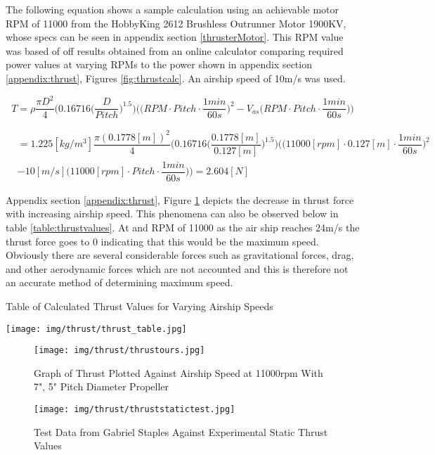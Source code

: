 \documentclass[../main.tex]{subfiles}
\begin{document}
The following equation shows a sample calculation using an achievable motor RPM of 11000 from the HobbyKing 2612 Brushless Outrunner Motor 1900KV, whose specs can be seen in appendix section \ref{thrusterMotor}. This RPM value was based of off results obtained from an online calculator comparing required power values at varying RPMs to the power shown in appendix section \ref{appendix:thrust}, Figures \ref{fig:thrustcalc}. An airship speed of 10m/s was used. 

\begin{equation}
\label{eqn:thrustfinal}
T = \rho \dfrac{\pi D^2}{4}\Bigg(0.16716\Big(\dfrac{D}{Pitch}\Big)^{1.5}\Bigg)\Bigg(\Big(RPM\cdot Pitch \cdot \dfrac{1min}{60s}\Big)^2 - V_{as}\Big(RPM\cdot Pitch \cdot \dfrac{1min}{60s}\Big)\Bigg)
\end{equation}

\begin{align*}
&= 1.225[kg/m^3] \dfrac{\pi (0.1778[m])^2}{4}\Bigg(0.16716\Big(\dfrac{0.1778[m]}{0.127[m]}\Big)^{1.5}\Bigg)\Bigg(\Big(11000[rpm]\cdot 0.127[m] \cdot \dfrac{1min}{60s}\Big)^2 \\ 
&- 10[m/s]\Big(11000[rpm]\cdot Pitch \cdot \dfrac{1min}{60s}\Big)\Bigg) = 2.604[N]
\end{align*}

Appendix section \ref{appendix:thrust}, Figure \ref{fig:thrusttablours} depicts the decrease in thrust force with increasing airship speed. This phenomena can also be observed below in table \ref{table:thrustvalues}. At and RPM of 11000 as the air ship reaches 24m/s the thrust force goes to 0 indicating that this would be the maximum speed. Obviously there are several considerable forces such as gravitational forces, drag, and other aerodynamic forces which are not accounted and this is therefore not an accurate method of determining maximum speed.
\begin{table}[H]
	\centering
    \caption{Table of Calculated Thrust Values for Varying Airship Speeds}
	\texttt{[image: img/thrust/thrust\_table.jpg]}
	\label{table:thrustvalues}
\end{table}
\begin{figure}[H]
	\centering
	\texttt{[image: img/thrust/thrustours.jpg]}
	\caption{Graph of Thrust Plotted Against Airship Speed at 11000rpm With 7", 5" Pitch Diameter Propeller}
	\label{fig:thrusttablours}
\end{figure}
\begin{figure}[H]
	\centering
	\texttt{[image: img/thrust/thruststatictest.jpg]}
	\caption{Test Data from Gabriel Staples Against Experimental Static Thrust Values \cite{thrusteq}}
	\label{fig:thruststatictest}
\end{figure}
\end{document}
